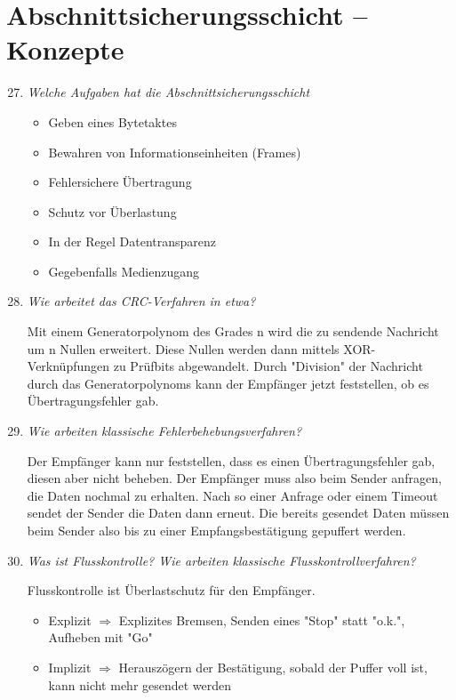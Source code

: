\documentclass[hidelinks]{article}
\begin{document}
\section{Abschnittsicherungsschicht -- Konzepte}
\begin{enumerate}
\setcounter{enumi}{26}
\item \textit{Welche Aufgaben hat die Abschnittsicherungsschicht}
\begin{itemize}
\item Geben eines Bytetaktes
\item Bewahren von Informationseinheiten (Frames)
\item Fehlersichere Übertragung
\item Schutz vor Überlastung
\item In der Regel Datentransparenz
\item Gegebenfalls Medienzugang
\end{itemize}
\item \textit{Wie arbeitet das CRC-Verfahren in etwa?}

Mit einem Generatorpolynom des Grades n wird die zu sendende Nachricht um n Nullen erweitert. Diese Nullen werden dann mittels XOR-Verknüpfungen zu Prüfbits abgewandelt. Durch "Division" der Nachricht durch das Generatorpolynoms kann der Empfänger jetzt feststellen, ob es Übertragungsfehler gab.

\item \textit{Wie arbeiten klassische Fehlerbehebungsverfahren?}

Der Empfänger kann nur feststellen, dass es einen Übertragungsfehler gab, diesen aber nicht beheben. Der Empfänger muss also beim Sender anfragen, die Daten nochmal zu erhalten. Nach so einer Anfrage oder einem Timeout sendet der Sender die Daten dann erneut. Die bereits gesendet Daten müssen beim Sender also bis zu einer Empfangsbestätigung gepuffert werden.

\item \textit{Was ist Flusskontrolle? Wie arbeiten klassische Flusskontrollverfahren?}

Flusskontrolle ist Überlastschutz für den Empfänger.
\begin{itemize}
\item Explizit $\Rightarrow$ Explizites Bremsen, Senden eines "Stop" statt "o.k.", Aufheben mit "Go"
\item Implizit $\Rightarrow$ Herauszögern der Bestätigung, sobald der Puffer voll ist, kann nicht mehr gesendet werden
\end{itemize}
\end{enumerate}
\end{document}
